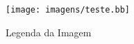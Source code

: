 \begin{figure}[!htb]
	\centering
	\texttt{[image: imagens/teste.bb]}
	\caption{Legenda da Imagem}
	\label{Label de referência para a imagem}
\end{figure}
